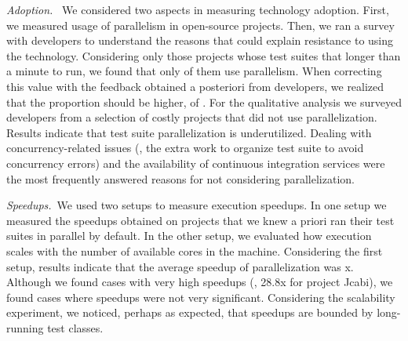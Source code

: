 \vspace{1ex}\noindent\emph{Adoption.}~ We considered two aspects in
measuring technology adoption.  First, we measured usage of
parallelism in open-source projects.  Then, we ran a survey with
developers to understand the reasons that could explain resistance to
using the technology.  Considering only those projects whose test suites
that longer than a minute to run, we found that only
\percentParallel{} of them use parallelism.  When correcting this
value with the feedback obtained a posteriori from developers, we
realized that the proportion should be higher, of
\percentParallelUpdated{}.  For the qualitative analysis we surveyed
developers from a selection of costly projects that did not use
parallelization.  Results indicate that test suite parallelization is
underutilized.  Dealing with concurrency-related issues (\eg{}, the
extra work to organize test suite to avoid concurrency errors) and the
availability of continuous integration services were the most
frequently answered reasons for not considering parallelization.


\vspace{1ex}\noindent\emph{Speedups.}~We used two setups to measure
execution speedups.  In one setup we measured the speedups obtained on
projects that we knew a priori ran their test suites in parallel by
default.  In the other setup, we evaluated how execution scales with
the number of available cores in the machine.  Considering the first setup, results
indicate that the average speedup of parallelization was
\avgSpeedup{}x.  Although we found cases with very high speedups
(\eg{}, 28.8x for project Jcabi), we found cases where speedups were
not very significant.  Considering the scalability experiment, we
noticed, perhaps as expected, that speedups are bounded by
long-running test classes.

